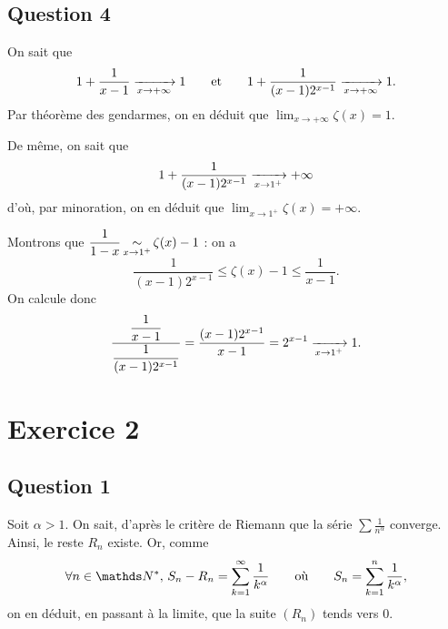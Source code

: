 \subsection{Question 4}

On sait que \[
	1 + \frac{1}{x-1} \xrightarrow[x\to +\infty]{} 1
	\qquad\text{et}\qquad
	1+ \frac{1}{(x-1)2^{x-1}} \xrightarrow[x\to +\infty]{} 1.
\]
Par théorème des gendarmes, on en déduit que $\lim_{x\to +\infty} \zeta(x) = 1$.

De même, on sait que \[
	1+\frac{1}{(x-1)2^{x-1}} \xrightarrow[x\to 1^+]{} +\infty
\] d'où, par minoration, on en déduit que $\lim_{x\to 1^+} \zeta(x) = +\infty$.


Montrons que $\displaystyle\frac{1}{1-x} \operatorname*{\sim}_{x\to 1^+} \zeta(x) - 1$ : on a \[
	\frac{1}{(x-1)2^{x-1}} \le \zeta(x) - 1 \le \frac{1}{x-1}
.\]
On calcule donc \[
	\frac{\displaystyle \frac{1}{x-1}}{\displaystyle\frac{1}{(x-1)2^{x-1}}} = \frac{(x-1)2^{x-1}}{x-1} = 2^{x-1} \xrightarrow[x\to 1^+]{} 1
.\]

\section{Exercice 2}
\subsection{Question 1}

Soit $\alpha > 1$. On sait, d'après le critère de {\sc Riemann}\/ que la série $\sum \frac{1}{n^\alpha}$\/ converge. Ainsi, le reste $R_n$\/ existe. Or, comme \[
	\forall n \in \N^*,\,S_n - R_n = \sum_{k=1}^\infty \frac{1}{k^\alpha} \qquad\text{où}\qquad S_n = \sum_{k=1}^n \frac{1}{k^\alpha},
\] on en déduit, en passant à la limite, que la suite $(R_n)$\/ tends vers 0.







